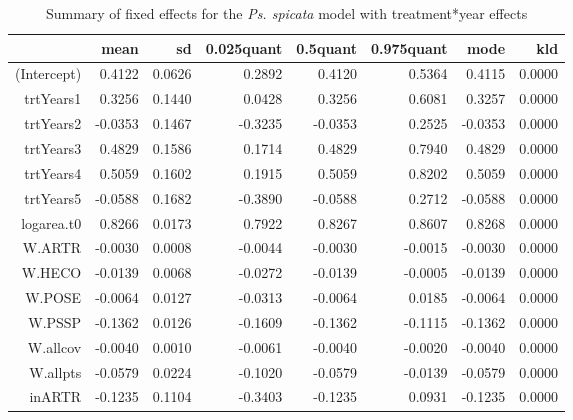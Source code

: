 \documentclass[11pt]{article}
\begin{document}
\begin{table}
\centering
\caption{Summary of fixed effects for the \textit{Ps. spicata} model with treatment*year effects} 
\label{table:PSSPgrowth-trtYears}
\begin{tabular}{rrrrrrrr}
  \hline
 & mean & sd & 0.025quant & 0.5quant & 0.975quant & mode & kld \\ 
  \hline
(Intercept) & 0.4122 & 0.0626 & 0.2892 & 0.4120 & 0.5364 & 0.4115 & 0.0000 \\ 
  trtYears1 & 0.3256 & 0.1440 & 0.0428 & 0.3256 & 0.6081 & 0.3257 & 0.0000 \\ 
  trtYears2 & -0.0353 & 0.1467 & -0.3235 & -0.0353 & 0.2525 & -0.0353 & 0.0000 \\ 
  trtYears3 & 0.4829 & 0.1586 & 0.1714 & 0.4829 & 0.7940 & 0.4829 & 0.0000 \\ 
  trtYears4 & 0.5059 & 0.1602 & 0.1915 & 0.5059 & 0.8202 & 0.5059 & 0.0000 \\ 
  trtYears5 & -0.0588 & 0.1682 & -0.3890 & -0.0588 & 0.2712 & -0.0588 & 0.0000 \\ 
  logarea.t0 & 0.8266 & 0.0173 & 0.7922 & 0.8267 & 0.8607 & 0.8268 & 0.0000 \\ 
  W.ARTR & -0.0030 & 0.0008 & -0.0044 & -0.0030 & -0.0015 & -0.0030 & 0.0000 \\ 
  W.HECO & -0.0139 & 0.0068 & -0.0272 & -0.0139 & -0.0005 & -0.0139 & 0.0000 \\ 
  W.POSE & -0.0064 & 0.0127 & -0.0313 & -0.0064 & 0.0185 & -0.0064 & 0.0000 \\ 
  W.PSSP & -0.1362 & 0.0126 & -0.1609 & -0.1362 & -0.1115 & -0.1362 & 0.0000 \\ 
  W.allcov & -0.0040 & 0.0010 & -0.0061 & -0.0040 & -0.0020 & -0.0040 & 0.0000 \\ 
  W.allpts & -0.0579 & 0.0224 & -0.1020 & -0.0579 & -0.0139 & -0.0579 & 0.0000 \\ 
  inARTR & -0.1235 & 0.1104 & -0.3403 & -0.1235 & 0.0931 & -0.1235 & 0.0000 \\ 
   \hline
\end{tabular}
\end{table}
\end{document}
